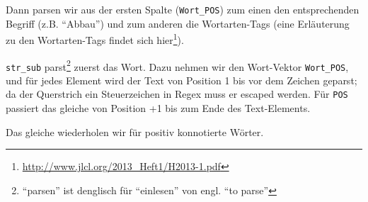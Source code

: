 \documentclass[12pt,]{book}
\makeatletter
\newenvironment{Shaded}{\begin{snugshade}}{\end{snugshade}}
\newcommand{\KeywordTok}[1]{\textcolor[rgb]{0.13,0.29,0.53}{\textbf{{#1}}}}
\newcommand{\DataTypeTok}[1]{\textcolor[rgb]{0.13,0.29,0.53}{{#1}}}
\newcommand{\DecValTok}[1]{\textcolor[rgb]{0.00,0.00,0.81}{{#1}}}
\newcommand{\CharTok}[1]{\textcolor[rgb]{0.31,0.60,0.02}{{#1}}}
\newcommand{\StringTok}[1]{\textcolor[rgb]{0.31,0.60,0.02}{{#1}}}
\newcommand{\OtherTok}[1]{\textcolor[rgb]{0.56,0.35,0.01}{{#1}}}
\newcommand{\NormalTok}[1]{{#1}}
\renewcommand{\href}[2]{#2\footnote{\url{#1}}}
\newenvironment{kframe}{%
\medskip{}
\setlength{\fboxsep}{.8em}
 \def\at@end@of@kframe{}%
 \ifinner\ifhmode%
  \def\at@end@of@kframe{\end{minipage}}%
  \begin{minipage}{\columnwidth}%
 \fi\fi%
 \def\FrameCommand##1{\hskip\@totalleftmargin \hskip-\fboxsep
 \colorbox{shadecolor}{##1}\hskip-\fboxsep
     \hskip-\linewidth \hskip-\@totalleftmargin \hskip\columnwidth}%
 \MakeFramed {\advance\hsize-\width
   \@totalleftmargin\z@ \linewidth\hsize
   \@setminipage}}%
 {\par\unskip\endMakeFramed%
 \at@end@of@kframe}
\renewenvironment{Shaded}{\begin{kframe}}{\end{kframe}}
\makeatother
\begin{document}
Dann parsen wir aus der ersten Spalte (\texttt{Wort\_POS}) zum einen den
entsprechenden Begriff (z.B. ``Abbau'') und zum anderen die
Wortarten-Tags (eine Erläuterung zu den Wortarten-Tags findet sich
\href{http://www.jlcl.org/2013_Heft1/H2013-1.pdf}{hier}).

\begin{Shaded}
\end{Shaded}

\texttt{str\_sub} parst\footnote{``parsen'' ist denglisch für
  ``einlesen'' von engl. ``to parse''} zuerst das Wort. Dazu nehmen wir
den Wort-Vektor \texttt{Wort\_POS}, und für jedes Element wird der Text
von Position 1 bis vor dem Zeichen \texttt{\textbar{}} geparst; da der
Querstrich ein Steuerzeichen in Regex muss er escaped werden. Für
\texttt{POS} passiert das gleiche von Position \texttt{\textbar{}}+1 bis
zum Ende des Text-Elements.

Das gleiche wiederholen wir für positiv konnotierte Wörter.

\begin{Shaded}
\end{Shaded}
\end{document}
